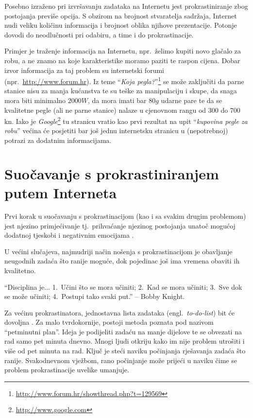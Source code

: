 \documentclass[11pt,twocolumn,english]{article}
\newcommand{\engl}[1]{(engl.~\emph{#1})}
\begin{document}
Posebno izraženo pri izvršavanju zadataka na Internetu jest prokrastiniranje zbog 
postojanja previše opcija. S obzirom na brojnost stvaratelja sadržaja, Internet
nudi veliku količinu informacija i brojnost oblika njihove prezentacije.
Potonje dovodi do neodlučnosti pri odabiru, a time i do prokrastinacije.

Primjer je traženje informacija na Internetu, npr.~želimo kupiti novo glačalo
za robu, a ne znamo na koje karakteristike moramo paziti te raspon cijena. 
Dobar izvor informacija za taj problem su internetski forumi
(npr.~\url{http://www.forum.hr}). Iz teme ``\emph{Koja pegla?}''\footnote{\url{http://www.forum.hr/showthread.php?t=129569}}
se može zaključiti da parne stanice nisu za manja kućanstva te su teške za
manipulaciju i skupe, da snaga mora biti minimalno $2000 W$, da mora
imati bar $80 g$ udarne pare te da se kvalitetne pegle (ali ne parne stanice)
nalaze u cjenovnom rangu od 300 do 700 kn. Iako je
\emph{Google}\footnote{\url{http://www.google.com}} tu stranicu vratio kao prvi
rezultat na upit ``\emph{kupovina pegle za robu}'' većina će posjetiti bar još
jednu internetsku stranicu u (nepotrebnoj) potrazi za dodatnim informacijama.


\section{Suočavanje s prokrastiniranjem putem Interneta}
Prvi korak u suočavanju s prokrastinacijom (kao i sa svakim drugim problemom)
jest njezino primjećivanje tj.~prihvaćanje njezinog postojanja unatoč
mogućoj dodatnoj tjeskobi i negativnim emocijama \cite{Kraut98internet}.

U većini slučajeva, najmudriji način nošenja s prokrastinacijom je obavljanje
neugodnih zadaća što ranije moguće, dok pojedinac još ima vremena obaviti ih kvalitetno.

``Disciplina je... 1.~Učini što se mora učiniti; 2.~Kad se mora učiniti; 3.~Sve
dok se može učiniti; 4.~Postupi tako svaki put.'' -- Bobby Knight.  

Za većinu prokrastinatora, jednostavna lista zadataka \engl{to-do-list}
bit će dovoljna \cite{TuckerPsySelfHelp}. Za malo tvrdokornije, postoji metoda
poznata pod nazivom ``petminutni plan''. Ideja je podijeliti zadaću na manje
dijelove te se obvezati na rad samo pet minuta dnevno. Mnogi ljudi otkriju kako
im nije problem utrošiti i više od pet minuta na rad. Ključ je steći naviku
počinjanja rješavanja zadaća što ranije. Svakodnevnom vježbom, rano počinjanje
može prijeći u naviku čime se problem prokrastinacije uvelike umanjuje.
\end{document}

